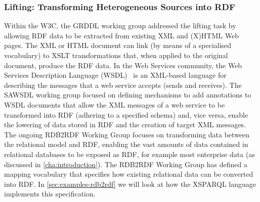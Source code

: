 \subsubsection*{Lifting: Transforming Heterogeneous Sources into RDF}
%
Within the \ac{W3C}, the \ac{GRDDL} working group addressed the lifting task by allowing \ac{RDF} data to be extracted
from existing \ac{XML} and (X)HTML Web pages.  The \ac{XML} or \ac{HTML} document can link (by means of a specialised
vocabulary) to \ac{XSLT} transformations that, when applied to the original document, produce the \ac{RDF} data.
%
In the Web Services community, the Web Services Description Language (WSDL)~\cite{ChinniciMoreauRyman:2007aa} is an
\ac{XML}-based language for describing the messages that a web service accepts (sends and receives).  The \ac{SAWSDL}
working group focused on defining mechanisms to add annotations to WSDL documents that allow the \ac{XML} messages of a
web service to be transformed into \ac{RDF} (adhering to a specified schema) and, vice versa, enable the lowering of
data stored in \ac{RDF} and the creation of target \ac{XML} messages.
%
The ongoing RDB2RDF Working Group focuses on transforming data between the relational model and \ac{RDF}, enabling the
vast amounts of data contained in relational databases to be exposed as \ac{RDF}, for example most enterprise data (as
discussed in \cref{cha:introduction}).
%
The RDB2RDF Working Group has defined a mapping vocabulary that specifies how existing relational data can be converted
into \ac{RDF}.  In \cref{sec:examples-rdb2rdf} we will look at how the XSPARQL language implements this
specification.



